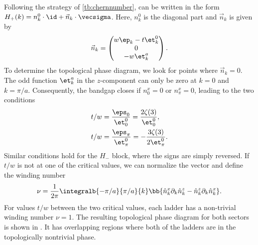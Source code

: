 Following the strategy of \cref{tb:chernnumber},  can be written in the form $H_+(k) = n^0_k \cdot \id + \vec{n}_k \cdot \vecsigma$. Here, $n^0_k$ is the diagonal part and $\vec{n}_k$ is given by
\begin{align}
    \vec{n}_k = \begin{pmatrix}
        w \ep_k - t \et^0_k \\
        0 \\
        -w \et^a_k
    \end{pmatrix}.
\end{align}
To determine the topological phase diagram, we look for points where $\vec{n}_k=0$.
The odd function $\et^a_k$ in the $z$-component can only be zero at $k = 0$ and $k=\pi/a$.
Consequently, the bandgap closes if $n^x_0 = 0$ or $n^x_{\pi} = 0$, leading to the two conditions
\begin{align}
    t/w  &= \frac{\eps_0}{\et^0_0} = \frac{2\zeta(3)}{\et^0_0}, \\
    t/w  &= \frac{\eps_{\pi}}{\et^0_{\pi}} = - \frac{3 \zeta(3)}{2 \et^0_{\pi}}.
\end{align}
Similar conditions hold for the $H_-$ block, where the signs are simply reversed.
If $t/w$ is not at one of the critical values, we can normalize the vector and define the winding number
\begin{align}
    \nu = \frac{1}{2\pi} \integralb{-\pi/a}{\pi/a}{k} \bb{ \hat{n}^x_k \partial_k \hat{n}^z_k - \hat{n}^z_k \partial_k \hat{n}^x_k }.
\end{align}
For values $t/w$ between the two critical values, each ladder has a non-trivial winding number $\nu = 1$.
The resulting topological phase diagram for both sectors is shown in .
It has overlapping regions where both of the ladders are in the topologically nontrivial phase.





